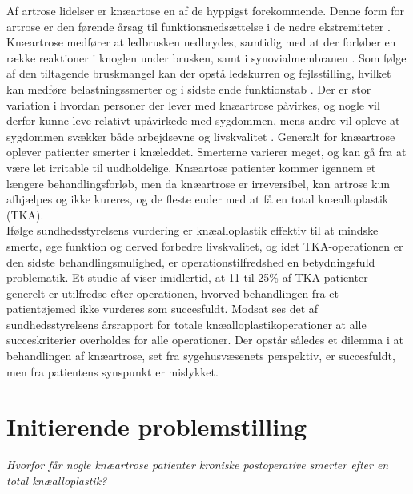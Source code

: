 Af artrose lidelser er knæartose en af de hyppigst forekommende. Denne form for artrose er den førende årsag til funktionsnedsættelse i de nedre ekstremiteter \citep{bezwick2012}. 
Knæartrose medfører at ledbrusken nedbrydes, samtidig med at der forløber en række reaktioner i knoglen under brusken, samt i synovialmembranen \citep{brostrom2012}. Som følge af den tiltagende bruskmangel kan der opstå ledskurren og fejlsstilling, hvilket kan medføre belastningssmerter og i sidste ende funktionstab \citep{ugeskrift2011}.
Der er stor variation i hvordan personer der lever med knæartrose påvirkes, og nogle vil derfor kunne leve relativt upåvirkede med sygdommen, mens andre vil opleve at sygdommen svækker både arbejdsevne og livskvalitet \citep{sygdom}.
Generalt for knæartrose oplever patienter smerter i knæleddet. Smerterne varierer meget, og kan gå fra at være let irritable til uudholdelige. Knæartose patienter kommer igennem et længere behandlingsforløb, men da knæartrose er irreversibel, kan artrose kun afhjælpes og ikke kureres, og de fleste ender med at få en total knæalloplastik (TKA).\\ 
Ifølge sundhedsstyrelsens vurdering er knæalloplastik effektiv til at mindske smerte, øge funktion og derved forbedre livskvalitet, og idet TKA-operationen er den sidste behandlingsmulighed, er operationstilfredshed en betydningsfuld problematik. %
Et studie af  viser imidlertid, at 11 til 25\% af TKA-patienter generelt er utilfredse efter operationen, hvorved behandlingen fra et patientøjemed ikke vurderes som succesfuldt.
Modsat ses det af sundhedsstyrelsens årsrapport for totale knæalloplastikoperationer at alle succeskriterier overholdes for alle operationer. \citep{aarsrapport2016} 
Der opstår således et dilemma i at behandlingen af knæartrose, set fra sygehusvæsenets perspektiv, er succesfuldt, men fra  patientens synspunkt er mislykket.

\section*{Initierende problemstilling}
\begin{center}
	\textit{Hvorfor får nogle knæartrose patienter kroniske postoperative smerter efter en total knæalloplastik?}
\end{center}


